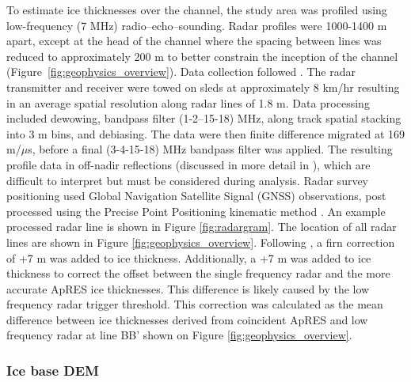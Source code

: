 To estimate ice thicknesses over the channel, the study area was profiled using low-frequency (7 MHz) radio--echo--sounding.  Radar profiles were 1000-1400 m apart, except at the head of the channel where the spacing between lines was reduced to approximately 200 m to better constrain the inception of the channel (Figure~\ref{fig:geophysics_overview}). %
Data collection followed \cite{christianson2016basal}. The radar transmitter and receiver were towed on sleds at approximately 8 km/hr resulting in an average spatial resolution along radar lines of 1.8 m. Data processing included dewowing, bandpass filter (1-2--15-18) MHz, along track spatial stacking into 3 m bins, and debiasing. The data were then finite difference migrated at 169 m/$\mu$s, before a final (3-4-15-18) MHz bandpass filter was applied. The resulting profile data in off-nadir reflections (discussed in more detail in \cite{christianson2016basal}), which are difficult to interpret but must be considered during analysis.  Radar survey positioning used Global Navigation Satellite Signal (GNSS) observations, post processed using the Precise Point Positioning kinematic method \citep{ppp2016}. An example processed radar line is shown in Figure \ref{fig:radargram}. The location of all radar lines are shown in Figure \ref{fig:geophysics_overview}.
Following \cite{dowdeswell2004investigations}, a firn correction of +7 m was added to ice thickness. Additionally, a +7 m was added to ice thickness to correct the offset between the single frequency radar and the more accurate ApRES ice thicknesses. This difference is likely caused by the low frequency radar trigger threshold. This correction was calculated as the mean difference between ice thicknesses derived from coincident ApRES and low frequency radar at line BB' shown on Figure \ref{fig:geophysics_overview}.

\subsubsection{Ice base DEM} \label{sec:interp}

